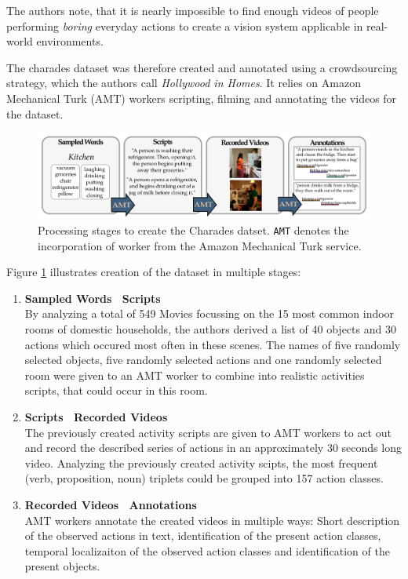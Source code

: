 The authors note, that it is nearly impossible to find enough videos of people performing \textit{boring} everyday actions to create a vision system applicable in real-world environments.

The charades dataset was therefore created and annotated using a crowdsourcing strategy, which the authors call \textit{Hollywood in Homes}.
It relies on Amazon Mechanical Turk (AMT) workers scripting, filming and annotating the videos for the dataset.

\begin{figure}[H]
    \centering
    \includegraphics[width=\textwidth]{img_datasets/charades_amt_creation}
    \caption{Processing stages to create the Charades datset. \texttt{AMT} denotes the incorporation of worker from the Amazon Mechanical Turk service. \cite{sigurdsson_hollywood_2016}} 
    \label{fig:charades_amt_creation}
\end{figure}

Figure \ref{fig:charades_amt_creation} illustrates creation of the dataset in multiple stages:

\begin{enumerate}
    \item \textbf{Sampled Words \textrightarrow\  Scripts}\\
    By analyzing a total of 549 Movies focussing on the 15 most common indoor rooms of domestic households, the authors derived a list of 40 objects and 30 actions which occured most often in these scenes. The names of five randomly selected objects, five randomly selected actions and one randomly selected room were given to an AMT worker to combine into realistic activities scripts, that could occur in this room.
\item \textbf{Scripts \textrightarrow\  Recorded Videos}\\
    The previously created activity scripts are given to AMT workers to act out and record the described series of actions in an approximately 30 seconds long video. Analyzing the previously created activity scipts, the most frequent (verb, proposition, noun) triplets could be grouped into 157 action classes.
\item \textbf{Recorded Videos \textrightarrow\  Annotations}\\
    AMT workers annotate the created videos in multiple ways: Short description of the observed actions in text, identification of the present action classes, temporal localizaiton of the observed action classes and identification of the present objects.
\end{enumerate}

